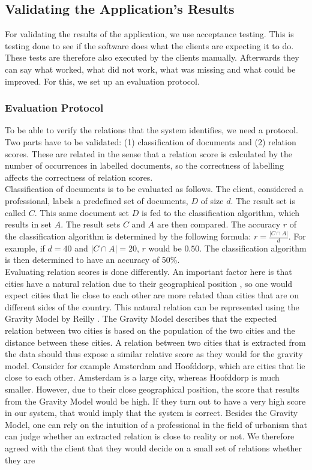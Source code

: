 \subsection{Validating the Application's Results}
For validating the results of the application, we use acceptance testing. This is testing done to see if the software does what the clients are expecting it to do. These tests are therefore also executed by the clients manually. Afterwards they can say what worked, what did not work, what was missing and what could be improved. For this, we set up an evaluation protocol.\\

\subsubsection{Evaluation Protocol}\label{sec:validation_protocol}
To be able to verify the relations that the system identifies, we need a protocol. Two parts have to be validated: (1) classification of documents and (2) relation scores. These are related in the sense that a relation score is calculated by the number of occurrences in labelled documents, so the correctness of labelling affects the correctness of relation scores.\\

Classification of documents is to be evaluated as follows. The client, considered a professional, labels a predefined set of documents, $D$ of size $d$. The result set is called $C$. This same document set $D$ is fed to the classification algorithm, which results in set $A$. The result sets $C$ and $A$ are then compared. The accuracy $r$ of the classification algorithm is determined by the following formula: $r = \frac{|C \cap A|}{d}$. For example, if $d=40$ and $|C \cap A|=20$, $r$ would be $0.50$. The classification algorithm is then determined to have an accuracy of 50\%.\\

Evaluating relation scores is done differently. An important factor here is that cities have a natural relation due to their geographical position \cite{tobler1970computer}, so one would expect cities that lie close to each other are more related than cities that are on different sides of the country. This natural relation can be represented using the Gravity Model by Reilly \cite{reilly1931law}. The Gravity Model describes that the expected relation between two cities is based on the population of the two cities and the distance between these cities. A relation between two cities that is extracted from the data should thus expose a similar relative score as they would for the gravity model. Consider for example Amsterdam and Hoofddorp, which are cities that lie close to each other. Amsterdam is a large city, whereas Hoofddorp is much smaller. However, due to their close geographical position, the score that results from the Gravity Model would be high. If they turn out to have a very high score in our system, that would imply that the system is correct. Besides the Gravity Model, one can rely on the intuition of a professional in the field of urbanism that can judge whether an extracted relation is close to reality or not. We therefore agreed with the client that they would decide on a small set of relations whether they are 

